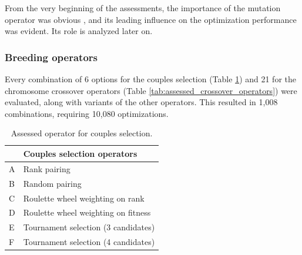 \documentclass[twocol]{ametsoc}
\begin{document}
From the very beginning of the assessments, the importance of the mutation operator was obvious \cite[see][for the details]{Horton2012a}, and its leading influence on the optimization performance was evident. Its role is analyzed later on.

\subsubsection{Breeding operators}

Every combination of 6 options for the couples selection (Table \ref{tab:assessed_couples_selection_operators}) and 21 for the chromosome crossover operators (Table \ref{tab:assessed_crossover_operators}) were evaluated, along with variants of the other operators. This resulted in 1,008 combinations, requiring 10,080 optimizations.

\begin{table}[htbp]
	\caption{Assessed operator for couples selection.}
	\begin{center}
		\begin{tabular}{ll}
			\hline\hline  & \textbf{Couples selection operators} \\ 
			\hline 
			A & Rank pairing \\ 
			B & Random pairing \\ 
			C & Roulette wheel weighting on rank \\ 
			D & Roulette wheel weighting on fitness \\ 
			E & Tournament selection (3 candidates) \\ 
			F & Tournament selection (4 candidates) \\ 
			\hline 
		\end{tabular}
	\end{center}
	\label{tab:assessed_couples_selection_operators}
\end{table}
\end{document}
